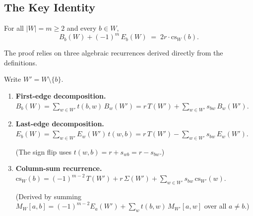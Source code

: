 \subsection{The Key Identity}

\begin{theorem}\label{thm:key-identity}
For all $|W| = m \geq 2$ and every $b \in W$,
\[
  B_b(W) + (-1)^m\, E_b(W) \;=\; 2r \cdot \mathrm{cs}_W(b).
\]
\end{theorem}

The proof relies on three algebraic recurrences derived directly from the
definitions.

\begin{lemma}[Recurrences]\label{lem:recurrences}
Write $W' = W \setminus \{b\}$.
\begin{enumerate}[label=\textup{(R\arabic*)},leftmargin=3em]
  \item\label{R1} \textbf{First-edge decomposition.}
    $\displaystyle
      B_b(W) = \sum_{w \in W'} t(b,w)\, B_w(W')
      = r\, T(W') + \sum_{w \in W'} s_{bw}\, B_w(W').
    $
  \item\label{R2} \textbf{Last-edge decomposition.}
    $\displaystyle
      E_b(W) = \sum_{w \in W'} E_w(W')\, t(w,b)
      = r\, T(W') - \sum_{w \in W'} s_{bw}\, E_w(W').
    $

    \smallskip\noindent
    (The sign flip uses $t(w,b) = r + s_{wb} = r - s_{bw}$.)
  \item\label{R3} \textbf{Column-sum recurrence.}
    $\displaystyle
      \mathrm{cs}_W(b) = (-1)^{m-2}\, T(W')
        + r\, \Sigma(W')
        + \sum_{w \in W'} s_{bw}\, \mathrm{cs}_{W'}(w).
    $

    \smallskip\noindent
    (Derived by summing
    $M_W[a,b] = (-1)^{m-2} E_a(W') + \sum_w t(b,w)\, M_{W'}[a,w]$
    over all $a \neq b$.)
\end{enumerate}
\end{lemma}

